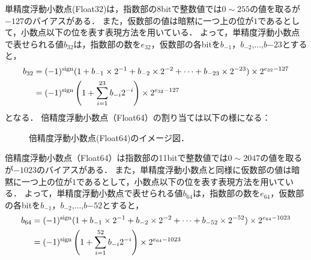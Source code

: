 単精度浮動小数点(Float32)は，指数部の8bitで整数値では$0 \sim  255$の値を取るが$-127$のバイアスがある．
また，仮数部の値は暗黙に一つ上の位が$1$であるとして，小数点以下の位を表す表現方法を用いている．
よって，単精度浮動小数点で表せられる値$b_{32}$は，指数部の数を$e_{32}$，仮数部の各bitを$b_{-1}$，$b_{-2}$,...,$b{-23}$とすると，
\begin{align}
    b_{32} &= (-1)^{\rm sign}(1 + b_{-1}\times 2^{-1} + b_{-2}\times 2^{-2} + \cdots + b_{-23}\times 2^{-23})\times 2^{e_{32} - 127} \\
        &= (-1)^{\rm sign}\left(1 + \sum_{i = 1}^{23} b_{-i} 2^{-i}\right)\times 2^{e_{32} - 127}
\end{align}
となる．
倍精度浮動小数点（Float64）の割り当ては以下の様になる：
\begin{figure}[H]
    \centering
    \caption{倍精度浮動小数点(Float64)のイメージ図．}
    \label{fig:float64_bit}
\end{figure}
倍精度浮動小数点（Float64）は指数部の11bitで整数値では$0 \sim  2047$の値を取るが$-1023$のバイアスがある．
また，単精度浮動小数点と同様に仮数部の値は暗黙に一つ上の位が$1$であるとして，小数点以下の位を表す表現方法を用いている．
よって，単精度浮動小数点で表せられる値$b_{64}$は，指数部の数を$e_{64}$，仮数部の各bitを$b_{-1}$，$b_{-2}$,...,$b{-52}$とすると，
\begin{align}
    b_{64} &= (-1)^{\rm sign}(1 + b_{-1}\times 2^{-1} + b_{-2}\times 2^{-2} + \cdots + b_{-52}\times 2^{-52})\times 2^{e_{64} - 1023} \\
        &= (-1)^{\rm sign}\left(1 + \sum_{i = 1}^{52} b_{-i} 2^{-i}\right)\times 2^{e_{64} - 1023}
\end{align}
